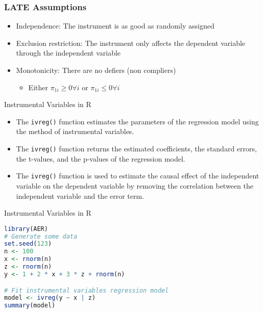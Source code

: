 \documentclass[serif, 9pt, aspectratio=32]{beamer}
\begin{document}
\begin{frame}
    \frametitle{LATE Assumptions}
    \begin{itemize}
        \setlength{\itemsep}{2em}
        \item Independence: The instrument is as good as randomly assigned
        \item Exclusion restriction: The instrument only affects the dependent variable through the independent variable
        \item Monotonicity: There are no defiers (non compliers)
              \begin{itemize}
                  \item Either $\pi_{1i} \geq 0 \forall i$ or $\pi_{1i} \leq 0 \forall i$
              \end{itemize}
    \end{itemize}
\end{frame}

\begin{frame}{Instrumental Variables in R}
    \begin{itemize}
        \setlength{\itemsep}{2em}
        \item The \texttt{ivreg()} function estimates the parameters of the regression model using the method of instrumental variables.
        \item The \texttt{ivreg()} function returns the estimated coefficients, the standard errors, the t-values, and the p-values of the regression model.
        \item The \texttt{ivreg()} function is used to estimate the causal effect of the independent variable on the dependent variable by removing the correlation between the independent variable and the error term.
    \end{itemize}
\end{frame}

\begin{frame}[fragile]{Instrumental Variables in R}
    \begin{lstlisting}[language=R]
library(AER)
# Generate some data 
set.seed(123)
n <- 100
x <- rnorm(n)
z <- rnorm(n)
y <- 1 + 2 * x + 3 * z + rnorm(n)

# Fit instrumental variables regression model
model <- ivreg(y ~ x | z)
summary(model)
    \end{lstlisting}
\end{frame}
\end{document}
